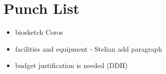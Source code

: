\section{Punch List}

\begin{itemize}

\item biosketch Coros
\item facilities and equipment - Stelian add paragraph
\item budget justification is needed (DDH)

\end{itemize}
